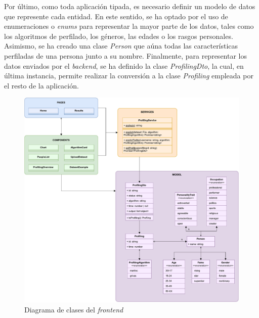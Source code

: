 \bigskip
Por último, como toda aplicación tipada, es necesario definir un modelo de datos que represente cada entidad. En este sentido, se ha optado
por el uso de enumeraciones o \textit{enums} para representar la mayor parte de los datos, tales como los algoritmos de perfilado, los géneros,
las edades o los rasgos personales. Asimismo, se ha creado una clase \textit{Person} que aúna todas las características
perfiladas de una persona junto a su nombre. Finalmente, para representar los datos enviados por el \textit{backend}, se ha definido la clase \textit{ProfilingDto},
la cual, en última instancia, permite realizar la conversión a la clase \textit{Profiling} empleada por el resto de la aplicación.


\bigskip
\begin{figure}[H]
	\centering
	\includegraphics[width=\textwidth]{diagramas/clases_front.pdf}
	\caption{Diagrama de clases del \textit{frontend}}
	\label{fig:implementacion_clases_frontend}
\end{figure}
